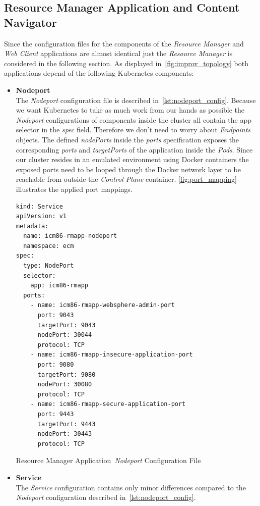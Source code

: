 \subsection{Resource Manager Application and Content Navigator}
Since the configuration files for the components of the \textit{Resource Manager} and \textit{Web Client} applications are almost identical just the \textit{Resource Manager} is considered in the following section.
As displayed in~\cref{fig:improv_topology} both applications depend of the following Kubernetes components:
\begin{itemize}
    \item[]{\textbf{Nodeport}\\
    The \textit{Nodeport} configuration file is described in~\cref{lst:nodeport_config}.
    Because we want Kubernetes to take as much work from our hands as possible the \textit{Nodeport} configurations of components inside the cluster all contain the app selector in the \textit{spec} field.
    Therefore we don't need to worry about \textit{Endpoints} objects.
    The defined \textit{nodePorts} inside the \textit{ports} specification exposes the corresponding \textit{ports} and \textit{targetPorts} of the application inside the \textit{Pods}.
    Since our cluster resides in an emulated environment using Docker containers the exposed ports need to be looped through the Docker network layer to be reachable from outside the \textit{Control Plane} container.
    \cref{fig:port_mapping} illustrates the applied port mappings.
\begin{Listing}[h]
\begin{lstlisting}
kind: Service
apiVersion: v1
metadata:
  name: icm86-rmapp-nodeport
  namespace: ecm
spec:
  type: NodePort
  selector:
    app: icm86-rmapp
  ports:
    - name: icm86-rmapp-websphere-admin-port
      port: 9043
      targetPort: 9043
      nodePort: 30044
      protocol: TCP
    - name: icm86-rmapp-insecure-application-port
      port: 9080
      targetPort: 9080
      nodePort: 30080
      protocol: TCP
    - name: icm86-rmapp-secure-application-port
      port: 9443
      targetPort: 9443
      nodePort: 30443
      protocol: TCP
\end{lstlisting}
\caption{Resource Manager Application~\textit{Nodeport} Configuration File}
\label{lst:nodeport_config}
\end{Listing}
    }
    \item[]{\textbf{Service}\\
    The \textit{Service} configuration contains only minor differences compared to the \textit{Nodeport} configuration described in~\cref{lst:nodeport_config}.
}
\end{itemize}
